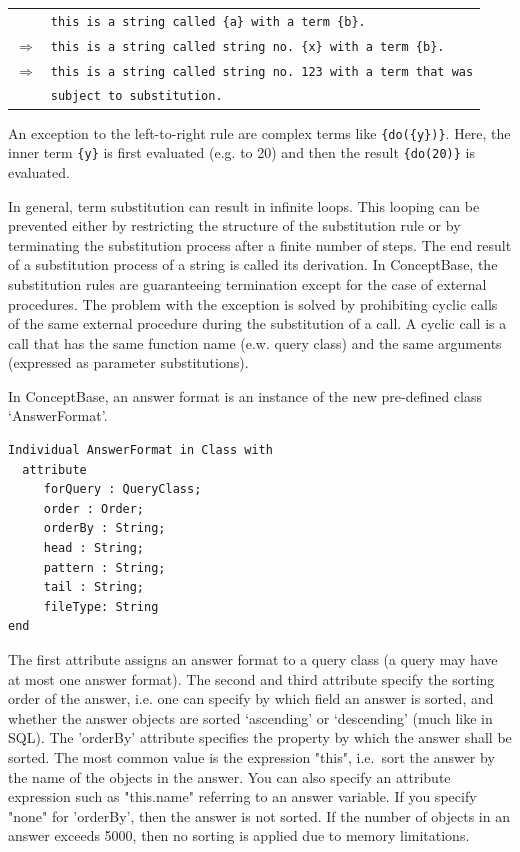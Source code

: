 \begin{tabular}{rl}
     & {\tt this is a string called \verb+{a}+ with a term \verb+{b}+.}\\
 $\Longrightarrow$ & {\tt this is a string called string no.\ \verb+{x}+ with a term \verb+{b}+.}  \\
 $\Longrightarrow$ & {\tt this is a string called string no.\ 123 with a term that was} \\
  &  {\tt subject to substitution.} \\
\end{tabular}

An exception to the left-to-right rule are complex terms like \verb+{do({y})}+. Here, the inner term \verb+{y}+ is first evaluated (e.g. to 20) and then the result \verb+{do(20)}+ is evaluated.

In general, term substitution can result in infinite loops. This looping can be prevented either by restricting the structure of the substitution rule or
by terminating the substitution process after a finite number of steps. The end result of a substitution process of a string is called its derivation. In
ConceptBase, the substitution rules are guaranteeing termination except for the case of external procedures. The problem with the exception is
solved by prohibiting cyclic calls of the same external procedure during the substitution of
a call.
A cyclic call is a call that has the same function name (e.w. query class) and
the same arguments (expressed as parameter substitutions).

In ConceptBase, an answer format is an instance of the new pre-defined class `AnswerFormat'.

\begin{verbatim}
Individual AnswerFormat in Class with
  attribute
     forQuery : QueryClass;
     order : Order;
     orderBy : String;
     head : String;
     pattern : String;
     tail : String;
     fileType: String
end
\end{verbatim}

The first attribute assigns an answer format to a query class (a query may have at most one answer format). The second and third attribute specify
the sorting order of the answer, i.e. one can specify by which field an answer is sorted, and whether the answer objects are sorted `ascending' or
`descending' (much like in SQL). The 'orderBy' attribute specifies the property by which the answer shall be sorted.
The most common value is the expression "this", i.e.\ sort the answer by the name of the objects in the answer. You can also
specify an attribute expression such as "this.name" referring to an answer variable. If you specify "none" for 'orderBy',
then the answer is not sorted. If the number of objects in an answer exceeds 5000, then no sorting is applied due to
memory limitations.


